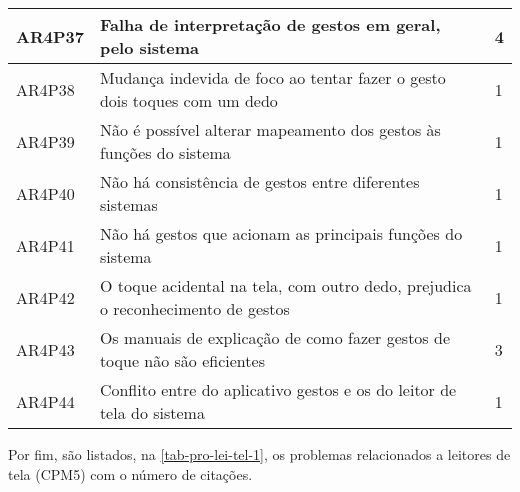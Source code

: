\begin{table}[htb]
\begin{center}
\begin{tabular}{p{1.2cm}|p{12.0cm}|p{1.2cm}}
      \hline
      AR4P37          & Falha de interpretação de gestos em geral, pelo sistema                            & 4                 \\
      \hline
      AR4P38          & Mudança indevida de foco ao tentar fazer o gesto dois toques com um dedo           & 1                 \\
      \hline
      AR4P39          & Não é possível alterar mapeamento dos gestos às funções do sistema                 & 1                 \\
      \hline
      AR4P40          & Não há consistência de gestos entre diferentes sistemas                            & 1                 \\
      \hline
      AR4P41          & Não há gestos que acionam as principais funções do sistema                         & 1                 \\
      \hline
      AR4P42          & O toque acidental na tela, com outro dedo, prejudica o reconhecimento de gestos    & 1                 \\
      \hline
      AR4P43          & Os manuais de explicação de como fazer gestos de toque não são eficientes          & 3                 \\
      \hline
      AR4P44          & Conflito entre do aplicativo gestos e os do leitor de tela do sistema              & 1                 \\
    \end{tabular}
  \end{center}
\end{table}

\newpage

Por fim, são listados, na \autoref{tab-pro-lei-tel-1}, os problemas relacionados a leitores de tela (CPM5) com o número de citações.

